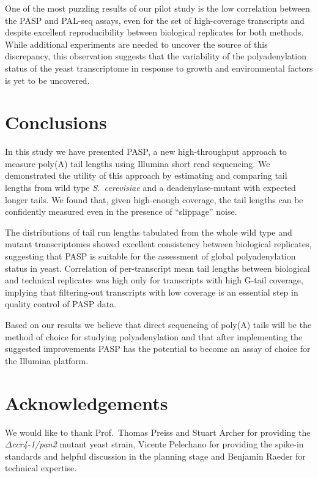 \documentclass[10pt]{article}
\begin{document}
One of the most puzzling results of our pilot study is the low correlation between the PASP and PAL-seq assays, even for the set of high-coverage transcripts and despite excellent reproducibility between biological replicates for both methods. While additional experiments are needed to uncover the source of this discrepancy, this observation suggests that the variability of the polyadenylation status of the yeast transcriptome in response to growth and environmental factors is yet to be uncovered.

\section*{Conclusions}

In this study we have presented PASP, a new high-throughput approach to measure poly(A) tail lengths using Illumina short read sequencing. We demonstrated the utility of this approach by estimating and comparing tail lengths from wild type \textit{S.~cerevisiae} and a deadenylase-mutant with expected longer tails. We found that, given high-enough coverage, the tail lengths can be confidently measured even in the presence of ``slippage'' noise.

The distributions of tail run lengths tabulated from the whole wild type and mutant transcriptomes showed excellent consistency between biological replicates, suggesting that PASP is suitable for the assessment of global polyadenylation status in yeast.
Correlation of per-transcript mean tail lengths between biological and technical replicates was high only for transcripts with high G-tail coverage, implying that filtering-out transcripts with low coverage is an essential step in quality control of PASP data.

Based on our results we believe that direct sequencing of poly(A) tails will be the method of choice for studying polyadenylation and that after implementing the suggested improvements PASP has the potential to become an assay of choice for the Illumina platform.
\section*{Acknowledgements}

We would like to thank Prof.\ Thomas Preiss and Stuart Archer for providing the \textit{$\Delta$ccr4-1/pan2} mutant yeast strain, Vicente Pelechano for providing the spike-in standards and helpful discussion in the planning stage and Benjamin Raeder for technical expertise.
\end{document}
